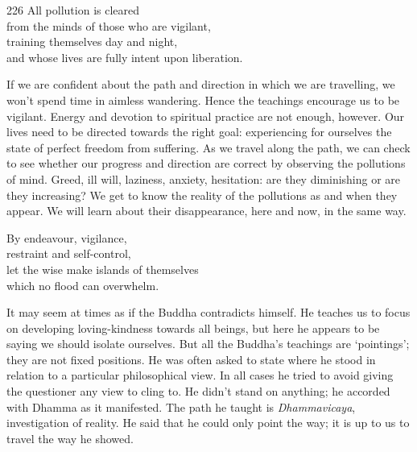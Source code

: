 
\begin{dhpVerse}{226}
\label{dhp-226}
All pollution is cleared\\
from the minds of those who are vigilant,\\
training themselves day and night,\\
and whose lives are fully intent upon liberation.
\end{dhpVerse}

\begin{dhpRefl}
  If we are confident about the path and direction in which we are travelling,
  we won’t spend time in aimless wandering. Hence the teachings encourage us to
  be vigilant. Energy and devotion to spiritual practice are not enough,
  however. Our lives need to be directed towards the right goal: experiencing
  for ourselves the state of perfect freedom from suffering. As we travel along
  the path, we can check to see whether our progress and direction are correct
  by observing the pollutions of mind. Greed, ill will, laziness, anxiety,
  hesitation: are they diminishing or are they increasing? We get to know the
  reality of the pollutions as and when they appear. We will learn about their
  disappearance, here and now, in the same way.
\end{dhpRefl}


\begin{dhpVerse}{25}
\label{dhp-25}
By endeavour, vigilance,\\
restraint and self-control,\\
let the wise make islands of themselves\\
which no flood can overwhelm.
\end{dhpVerse}

\begin{dhpRefl}
  It may seem at times as if the Buddha contradicts himself. He teaches us to
  focus on developing loving-kindness towards all beings, but here he appears to
  be saying we should isolate ourselves. But all the Buddha’s teachings are
  ‘pointings’; they are not fixed positions. He was often asked to state where
  he stood in relation to a particular philosophical view. In all cases he tried
  to avoid giving the questioner any view to cling to. He didn’t stand on
  anything; he accorded with Dhamma as it manifested. The path he taught is
  \emph{Dhammavicaya}, investigation of reality. He said that he could only
  point the way; it is up to us to travel the way he showed.
\end{dhpRefl}

